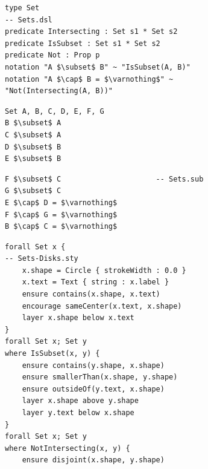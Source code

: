 \begin{figure}[ph]
\begin{minipage}[t]{\columnwidth}
\begin{mdframed}[style=DSLCode]
\begin{lstlisting}[language=Elem,escapechar=@,numbers=none]
type Set                                                             -- Sets.dsl
predicate Intersecting : Set s1 * Set s2
predicate IsSubset : Set s1 * Set s2
predicate Not : Prop p
notation "A $\subset$ B" ~ "IsSubset(A, B)"
notation "A $\cap$ B = $\varnothing$" ~ "Not(Intersecting(A, B))"
\end{lstlisting}
\end{mdframed}
\end{minipage}
\begin{mdframed}[style=SUBCode]
\begin{minipage}[t]{0.5\columnwidth}
\begin{lstlisting}[language=Sub-SET,escapechar=@,numbers=none]
Set A, B, C, D, E, F, G
B $\subset$ A
C $\subset$ A
D $\subset$ B
E $\subset$ B
\end{lstlisting}
\end{minipage}
\ContinueLineNumber
\begin{minipage}[t]{.5\columnwidth}
\begin{lstlisting}[language=Sub-mesh,escapechar=@,numbers=none]
F $\subset$ C                      -- Sets.sub
G $\subset$ C
E $\cap$ D = $\varnothing$
F $\cap$ G = $\varnothing$
B $\cap$ C = $\varnothing$
\end{lstlisting}\end{minipage}\end{mdframed}
\vspace{-.9\baselineskip}
\begin{minipage}[t]{\columnwidth}
\begin{mdframed}[style=STYCode]
\begin{lstlisting}[language=Sty-ST,escapechar=@,numbers=none]
forall Set x {                                                 -- Sets-Disks.sty 
    x.shape = Circle { strokeWidth : 0.0 }
    x.text = Text { string : x.label }
    ensure contains(x.shape, x.text)
    encourage sameCenter(x.text, x.shape)
    layer x.shape below x.text
}
forall Set x; Set y
where IsSubset(x, y) {
    ensure contains(y.shape, x.shape)
    ensure smallerThan(x.shape, y.shape)
    ensure outsideOf(y.text, x.shape)
    layer x.shape above y.shape
    layer y.text below x.shape
}
forall Set x; Set y
where NotIntersecting(x, y) {
    ensure disjoint(x.shape, y.shape)

\end{lstlisting}
\end{mdframed}
\end{minipage}
\end{figure}
